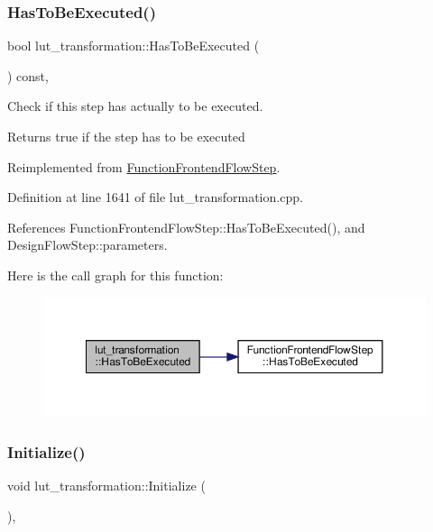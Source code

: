 \subsubsection{\texorpdfstring{Has\+To\+Be\+Executed()}{HasToBeExecuted()}}
{\footnotesize\ttfamily bool lut\+\_\+transformation\+::\+Has\+To\+Be\+Executed (\begin{DoxyParamCaption}{ }\end{DoxyParamCaption}) const\hspace{0.3cm}{\ttfamily [override]}, {\ttfamily [virtual]}}



Check if this step has actually to be executed. 

\begin{DoxyReturn}{Returns}
true if the step has to be executed 
\end{DoxyReturn}


Reimplemented from \hyperlink{classFunctionFrontendFlowStep_a12e786363530aa9533e4bd9380130d75}{Function\+Frontend\+Flow\+Step}.



Definition at line 1641 of file lut\+\_\+transformation.\+cpp.



References Function\+Frontend\+Flow\+Step\+::\+Has\+To\+Be\+Executed(), and Design\+Flow\+Step\+::parameters.

Here is the call graph for this function\+:
\nopagebreak
\begin{figure}[H]
\begin{center}
\leavevmode
\includegraphics[width=350pt]{d4/d19/classlut__transformation_a41cd40761d625f5f747b78b51d545c95_cgraph}
\end{center}
\end{figure}
\mbox{\label{classlut__transformation_ae48068e30dd6842435f9e26c23b11485}} 
\subsubsection{\texorpdfstring{Initialize()}{Initialize()}}
{\footnotesize\ttfamily void lut\+\_\+transformation\+::\+Initialize (\begin{DoxyParamCaption}{ }\end{DoxyParamCaption})\hspace{0.3cm}{\ttfamily [override]}, {\ttfamily [virtual]}}



